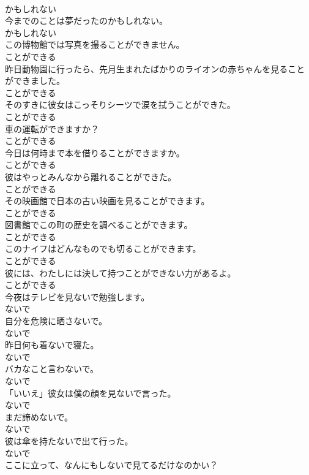 \documentclass[8pt]{extreport}
\begin{document}
\begin{CJK}{UTF8}{min}
\\	かもしれない	
\\	今までのことは夢だったのかもしれない。	
\\	かもしれない	
\\	この博物館では写真を撮ることができません。	
\\	ことができる	
\\	昨日動物園に行ったら、先月生まれたばかりのライオンの赤ちゃんを見ることができました。	
\\	ことができる	
\\	そのすきに彼女はこっそりシーツで涙を拭うことができた。	
\\	ことができる	
\\	車の運転ができますか？	
\\	ことができる	
\\	今日は何時まで本を借りることができますか。	
\\	ことができる	
\\	彼はやっとみんなから離れることができた。	
\\	ことができる	
\\	その映画館で日本の古い映画を見ることができます。	
\\	ことができる	
\\	図書館でこの町の歴史を調べることができます。	
\\	ことができる	
\\	このナイフはどんなものでも切ることができます。	
\\	ことができる	
\\	彼には、わたしには決して持つことができない力があるよ。	
\\	ことができる	
\\	今夜はテレビを見ないで勉強します。	
\\	ないで	
\\	自分を危険に晒さないで。	
\\	ないで	
\\	昨日何も着ないで寝た。	
\\	ないで	
\\	バカなこと言わないで。	
\\	ないで	
\\	「いいえ」彼女は僕の顔を見ないで言った。	
\\	ないで	
\\	まだ諦めないで。	
\\	ないで	
\\	彼は傘を持たないで出て行った。	
\\	ないで	
\\	ここに立って、なんにもしないで見てるだけなのかい？	

\end{CJK}
\end{document}
